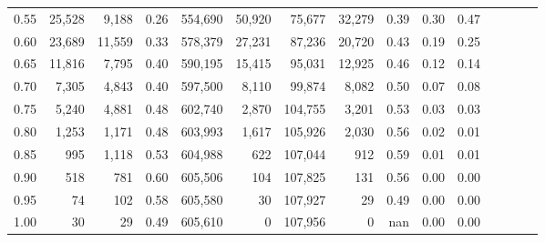 \begin{tabular}{rrrcrrrrrrrrrrr}
0.55 &   25,528 &   9,188 &                                       0.26 &  554,690 &   50,920 &   75,677 &   32,279 &  0.39 &  0.30 &                         0.47 \\
0.60 &   23,689 &  11,559 &                                       0.33 &  578,379 &   27,231 &   87,236 &   20,720 &  0.43 &  0.19 &                         0.25 \\
0.65 &   11,816 &   7,795 &                                       0.40 &  590,195 &   15,415 &   95,031 &   12,925 &  0.46 &  0.12 &                         0.14 \\
0.70 &    7,305 &   4,843 &                                       0.40 &  597,500 &    8,110 &   99,874 &    8,082 &  0.50 &  0.07 &                         0.08 \\
0.75 &    5,240 &   4,881 &                                       0.48 &  602,740 &    2,870 &  104,755 &    3,201 &  0.53 &  0.03 &                         0.03 \\
0.80 &    1,253 &   1,171 &                                       0.48 &  603,993 &    1,617 &  105,926 &    2,030 &  0.56 &  0.02 &                         0.01 \\
0.85 &      995 &   1,118 &                                       0.53 &  604,988 &      622 &  107,044 &      912 &  0.59 &  0.01 &                         0.01 \\
0.90 &      518 &     781 &                                       0.60 &  605,506 &      104 &  107,825 &      131 &  0.56 &  0.00 &                         0.00 \\
0.95 &       74 &     102 &                                       0.58 &  605,580 &       30 &  107,927 &       29 &  0.49 &  0.00 &                         0.00 \\
1.00 &       30 &      29 &                                       0.49 &  605,610 &        0 &  107,956 &        0 &   nan &  0.00 &                         0.00 \\
\bottomrule
\end{tabular}
